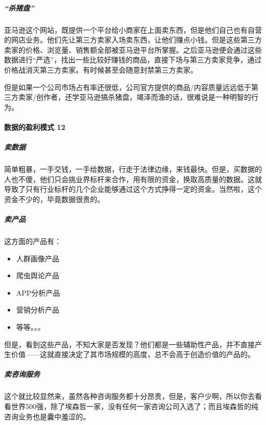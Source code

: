 \documentclass[letterpaper,10pt,english]{sphinxmanual}
\begin{document}
\subparagraph{“杀猪盘”}
\label{\detokenize{chapter_introduction/money:id15}}
亚马逊这个网站，既提供一个平台给小商家在上面卖东西，但是他们自己也有自营的网店业务。他们先让第三方卖家入场卖东西，让他们赚点小钱。但是这些第三方卖家的价格、浏览量、销售额全部被亚马逊平台所掌握。之后亚马逊便会通过这些数据进行“严选”，找出一些比较好赚钱的商品，直接下场与第三方卖家竞争，通过价格战消灭第三方卖家。有时候甚至会随意封禁第三方卖家。

但是如果一个公司市场占有率还很低，公司官方提供的商品/内容质量远远低于第三方卖家/创作者，还学亚马逊搞杀猪盘，竭泽而渔的话，很难说是一种明智的行为。


\paragraph{数据的盈利模式 12\sphinxfootnotemark[149]}
\label{\detokenize{chapter_introduction/money:id16}}%
\begin{footnotetext}[149]\sphinxAtStartFootnote
{}
%
\end{footnotetext}\ignorespaces 

\subparagraph{卖数据}
\label{\detokenize{chapter_introduction/money:id17}}
简单粗暴，一手交钱，一手给数据，行走于法律边缘，来钱最快。但是，买数据的人也不傻，他们只会挑业界标杆来合作，用有限的资金，换取高质量的数据。这就导致了只有行业标杆的几个企业能够通过这个方式挣得一定的资金。当然啦，这个资金不少的，毕竟数据很贵的。


\subparagraph{卖产品}
\label{\detokenize{chapter_introduction/money:id18}}
这方面的产品有：
\begin{itemize}
\item {} 
人群画像产品

\item {} 
爬虫舆论产品

\item {} 
APP分析产品

\item {} 
营销分析产品

\item {} 
等等。。。

\end{itemize}

但是，看到这些产品，不知大家是否发现？他们都是一些辅助性产品，并不直接产生价值——这就直接决定了其市场规模的高度，总不会高于创造价值的产品的。


\subparagraph{卖咨询服务}
\label{\detokenize{chapter_introduction/money:id19}}
这个就比较显然来，虽然各种咨询服务都十分昂贵，但是，客户少啊，所以你去看看世界500强，除了埃森哲一家，没有任何一家咨询公司入选了；而且埃森哲的纯咨询业务也是囊中羞涩的。
\end{document}
